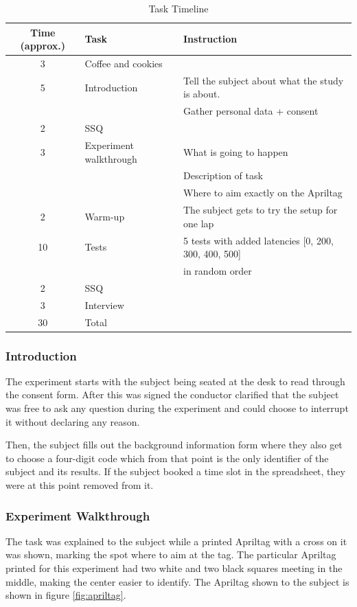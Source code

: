 \documentclass[nofilelist]{cslthse-msc}
\begin{document}
\begin{table}[ht]
   \centering
   \caption{Task Timeline}
   \label{tab:task-timeline}
   \begin{tabular}{|c|l|l|}
   \hline
   \textbf{Time (approx.)} & \textbf{Task} & \textbf{Instruction} \\ \hline
   3 & Coffee and cookies & \\ \hline
   5 & Introduction & Tell the subject about what the study is about. \\
   & & Gather personal data + consent \\ \hline
   2 & SSQ & \\ \hline
   3 & Experiment walkthrough & What is going to happen \\
   & & Description of task \\
   & & Where to aim exactly on the Apriltag \\ \hline
   2 & Warm-up & The subject gets to try the setup for one lap \\ \hline
   10 & Tests & 5 tests with added latencies [0, 200, 300, 400, 500] \\ 
   & & in random order \\ \hline
   2 & SSQ & \\ \hline
   3 & Interview & \\ \hline
   30 & Total & \\ \hline
   \end{tabular}
\end{table}

\subsubsection{Introduction}
The experiment starts with the subject being seated at the desk to read through the consent form. After this was signed the conductor clarified that the subject was free to ask any question during the experiment and could choose to interrupt it without declaring any reason. 

Then, the subject fills out the background information form where they also get to choose a four-digit code which from that point is the only identifier of the subject and its results. If the subject booked a time slot in the spreadsheet, they were at this point removed from it.

\subsubsection{Experiment Walkthrough}
The task was explained to the subject while a printed Apriltag with a cross on it was shown, marking the spot where to aim at the tag. The particular Apriltag printed for this experiment had two white and two black squares meeting in the middle, making the center easier to identify. The Apriltag shown to the subject is shown in figure \ref{fig:apriltag}.
\end{document}

